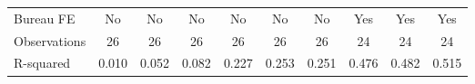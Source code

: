 {\begin{tabular}{l*{9}{c}}
Bureau FE   &          No         &          No         &          No         &          No         &          No         &          No         &         Yes         &         Yes         &         Yes         \\
Observations&          26         &          26         &          26         &          26         &          26         &          26         &          24         &          24         &          24         \\
R-squared   &       0.010         &       0.052         &       0.082         &       0.227         &       0.253         &       0.251         &       0.476         &       0.482         &       0.515         \\
\bottomrule
\end{tabular}
}
